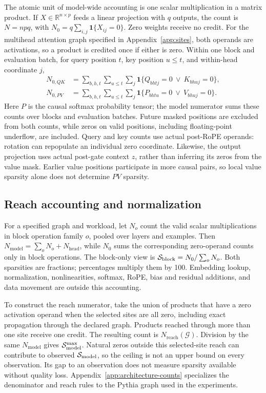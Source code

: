 The atomic unit of model-wide accounting is one scalar multiplication in a
matrix product. If $X\in\mathbb{R}^{n\times p}$ feeds a linear projection with
$q$ outputs, the count is $N=npq$, with $N_0=q\sum_{i,j}\mathbf{1}\{X_{ij}=0\}$.
Zero weights receive no credit. For the multihead attention graph specified in Appendix~\ref{app:sites},
both operands are activations,
so a product is credited once if either is zero. Within one block and
evaluation batch, for query position $t$,
key position $u\leq t$, and within-head coordinate $j$,
\begin{align}
N_{0,QK}&=\sum_{b,h,t}\sum_{u\leq t}\sum_j
\mathbf{1}\{Q_{bhtj}=0\ \lor\ K_{bhuj}=0\},\label{eq:qk-count}\\
N_{0,PV}&=\sum_{b,h,t}\sum_{u\leq t}\sum_j
\mathbf{1}\{P_{bhtu}=0\ \lor\ V_{bhuj}=0\}.\label{eq:pv-count}
\end{align}
Here $P$ is the causal softmax probability tensor; the model numerator sums
these counts over blocks and evaluation batches. Future masked positions
are excluded from both counts, while zeros on valid positions, including
floating-point underflow, are included. Query and key counts use actual
post-RoPE operands: rotation can repopulate an individual zero coordinate.
Likewise, the output projection uses actual post-gate context $z$, rather than
inferring its zeros from the value mask. Earlier value positions participate
in more causal pairs, so local value sparsity alone does not determine $PV$
sparsity.

\subsection{Reach accounting and normalization}
\label{app:ceiling}

For a specified graph and workload, let $N_o$ count the valid scalar
multiplications in block operation family $o$, pooled over layers and
examples. Then $N_{\mathrm{model}}=\sum_o N_o+N_{\mathrm{head}}$, while $N_0$
sums the corresponding zero-operand counts only in block operations.
The block-only view is $\mathcal{S}_{\mathrm{block}}=N_0/\sum_o N_o$. Both sparsities are fractions;
percentages multiply them by 100. Embedding lookup, normalization,
nonlinearities, softmax, RoPE, bias and residual additions, and data movement
are outside this accounting.

To construct the reach numerator, take the union of products that have a
zero activation operand when the selected sites are all zero, including
exact propagation through the declared graph. Products reached through more
than one site receive one credit. The resulting count is
$N_{\mathrm{reach}}(\mathcal{G})$. Division by the same $N_{\mathrm{model}}$
gives $\mathcal{S}_{\mathrm{model}}^{\max}$. Natural zeros outside this selected-site reach can contribute
to observed $\mathcal{S}_{\mathrm{model}}$, so the ceiling is not an upper bound on every
observation. Its gap to an observation does not measure sparsity available
without quality loss. Appendix~\ref{app:architecture-counts} specializes
the denominator and reach rules to the Pythia graph used in the experiments.
